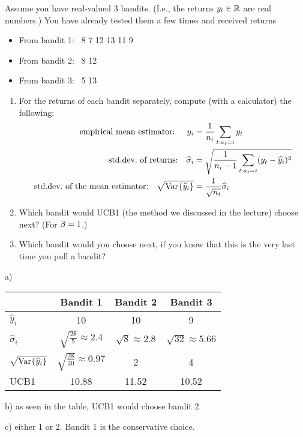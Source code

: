 

\renewcommand{\course}{Artificial Intelligence}
\renewcommand{\coursepicture}{course_ai}
\renewcommand{\coursedate}{Summer 2023}

\renewcommand{\exnum}{Exercise 2}

\exercises
\exercisestitle



Assume you have real-valued 3 bandits. (I.e., the returns $y_t\in{\mathbb{R}}$ are real numbers.) You have already tested them a few times
and received returns
\begin{itemize}
\item From bandit 1:~ 8 7 12 13 11 9
\item From bandit 2:~ 8 12
\item From bandit 3:~ 5 13
\end{itemize}

\begin{enumerate}
    \item For the returns of each bandit separately, compute (with a calculator) the following:
  \begin{align}
    \text{empirical mean estimator: \quad} y_i &= \frac{1}{n_i} \sum_{t:a_t=i} y_t \\
    \text{std.dev.\ of returns:\quad} \widehat {\sigma}_i &= \sqrt{\frac{1}{n_i-1} \sum_{t:a_t=i} (y_t - \widehat y_i)^2} \\
      \text{std.dev.\ of the mean estimator:\quad} \sqrt{\text{Var}_{}\{\widehat y_i\}} &= \frac{1}{\sqrt{n_i}} \widehat {\sigma}_i
      \end{align}

  \item Which bandit would UCB1 (the method we discussed in the lecture) choose next? (For $\beta=1$.)

  \item Which bandit would you choose next, if you know
    that this is the very last time you pull a bandit?

\end{enumerate}

\begin{solution}
	a)
	\begin{center}
		\begin{tabular}{lccc}
			\hline
			& Bandit 1 & Bandit 2 & Bandit 3\\
			\hline
			$\hat{y}_i$ & 10 & 10 & 9\\
			$\hat{\sigma}_i$ & $\sqrt{\frac{28}{5}}\approx2.4$ & $\sqrt{8}\approx2.8$ & $\sqrt{32} \approx5.66$ \\
			$\sqrt{\text{Var}_{}\{\widehat{y}_i\}}$ & $\sqrt{\frac{28}{30}}\approx0.97$ & 2 & 4 \\
			UCB1 &10.88&11.52&10.52\\
			\hline
		\end{tabular}
	\end{center}
	b) as seen in the table, UCB1 would choose bandit 2
	
	c) either 1 or 2. Bandit 1 is the conservative choice.
\end{solution}

